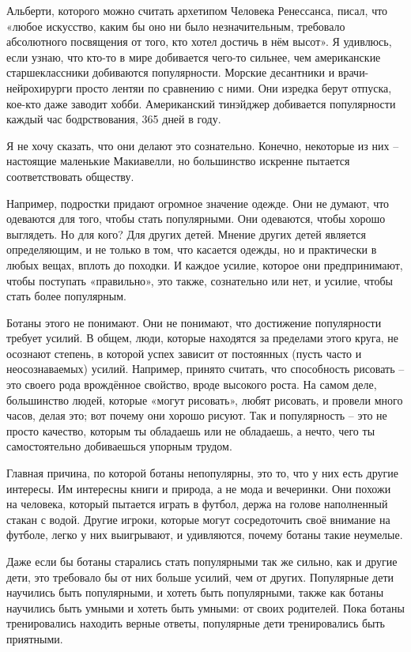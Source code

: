 \documentclass[ebook,12pt,oneside,openany]{memoir}
\begin{document}
Альберти, которого можно считать архетипом Человека Ренессанса, писал,
что «любое искусство, каким бы оно ни было незначительным, требовало
абсолютного посвящения от того, кто хотел достичь в нём высот». Я
удивлюсь, если узнаю, что кто-то в мире добивается чего-то сильнее,
чем американские старшеклассники добиваются популярности. Морские
десантники и врачи-нейрохирурги просто лентяи по сравнению с ними. Они
изредка берут отпуска, кое-кто даже заводит хобби. Американский
тинэйджер добивается популярности каждый час бодрствования, 365 дней в
году.

Я не хочу сказать, что они делают это сознательно. Конечно, некоторые
из них – настоящие маленькие Макиавелли, но большинство искренне
пытается соответствовать обществу.

Например, подростки придают огромное значение одежде. Они не думают,
что одеваются для того, чтобы стать популярными. Они одеваются, чтобы
хорошо выглядеть. Но для кого? Для других детей. Мнение других детей
является определяющим, и не только в том, что касается одежды, но и
практически в любых вещах, вплоть до походки. И каждое усилие, которое
они предпринимают, чтобы поступать «правильно», это также, сознательно
или нет, и усилие, чтобы стать более популярным.

Ботаны этого не понимают. Они не понимают, что достижение популярности
требует усилий. В общем, люди, которые находятся за пределами этого
круга, не осознают степень, в которой успех зависит от постоянных
(пусть часто и неосознаваемых) усилий. Например, принято считать, что
способность рисовать – это своего рода врождённое свойство, вроде
высокого роста. На самом деле, большинство людей, которые «могут
рисовать», любят рисовать, и провели много часов, делая это; вот
почему они хорошо рисуют. Так и популярность – это не просто качество,
которым ты обладаешь или не обладаешь, а нечто, чего ты самостоятельно
добиваешься упорным трудом.

Главная причина, по которой ботаны непопулярны, это то, что у них есть
другие интересы. Им интересны книги и природа, а не мода и вечеринки.
Они похожи на человека, который пытается играть в футбол, держа на
голове наполненный стакан с водой. Другие игроки, которые могут
сосредоточить своё внимание на футболе, легко у них выигрывают, и
удивляются, почему ботаны такие неумелые.

Даже если бы ботаны старались стать популярными так же сильно, как и
другие дети, это требовало бы от них больше усилий, чем от других.
Популярные дети научились быть популярными, и хотеть быть популярными,
также как ботаны научились быть умными и хотеть быть умными: от своих
родителей. Пока ботаны тренировались находить верные ответы,
популярные дети тренировались быть приятными.
\end{document}

